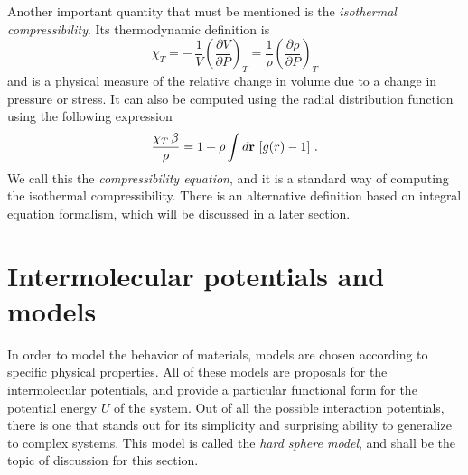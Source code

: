 Another important quantity that must be mentioned is the
\emph{isothermal compressibility}. Its thermodynamic definition is
\begin{equation}
    \chi_{T} = - \, \frac{1}{V} { \left( \frac{\partial V}{\partial P} \right) }_{T} =
    \frac{1}{\rho} { \left( \frac{\partial \rho}{\partial P} \right) }_{T}
    \label{eq:isothermal-chi}
\end{equation}
and is a physical measure of the relative change in volume due to a change
in pressure or stress.
It can also be computed using the radial distribution function using the following
expression~\cite{hansenTheorySimpleLiquids2013}
\begin{equation}
    \frac{\chi_{T} \, \beta}{\rho} = 1 + \rho \int d \mathbf{r} \, \left[ g(r) - 1 \right]
    \, .
    \label{eq:chi-rdf}
\end{equation}
We call this the \emph{compressibility equation}, and it is a standard way of computing
the isothermal compressibility. There is an alternative definition based on integral 
equation formalism, which will be discussed in a later section.

\section{Intermolecular potentials and models}

In order to model the behavior of materials, models are chosen according to specific
physical properties. All of these models are proposals for the intermolecular potentials,
and provide a particular functional form for the potential energy $U$ of the system.
Out of all the possible interaction potentials, there is one that stands out for its
simplicity and surprising ability to generalize to complex systems. This model is
called the \emph{hard sphere model}, and shall be the topic of discussion for this
section.

